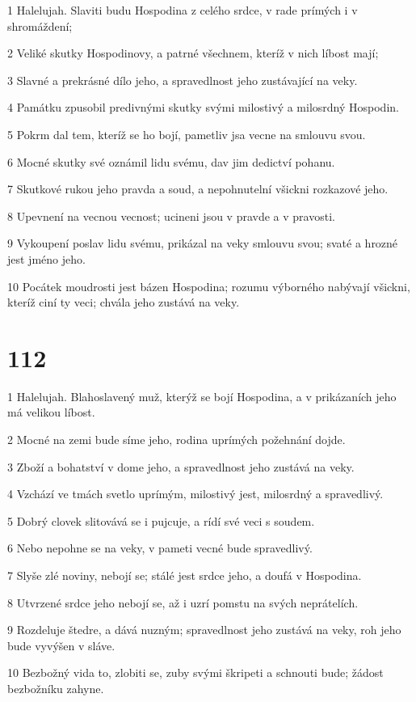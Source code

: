 \par 1 Halelujah. Slaviti budu Hospodina z celého srdce, v rade prímých i v shromáždení;
\par 2 Veliké skutky Hospodinovy, a patrné všechnem, kteríž v nich líbost mají;
\par 3 Slavné a prekrásné dílo jeho, a spravedlnost jeho zustávající na veky.
\par 4 Památku zpusobil predivnými skutky svými milostivý a milosrdný Hospodin.
\par 5 Pokrm dal tem, kteríž se ho bojí, pametliv jsa vecne na smlouvu svou.
\par 6 Mocné skutky své oznámil lidu svému, dav jim dedictví pohanu.
\par 7 Skutkové rukou jeho pravda a soud, a nepohnutelní všickni rozkazové jeho.
\par 8 Upevnení na vecnou vecnost; ucineni jsou v pravde a v pravosti.
\par 9 Vykoupení poslav lidu svému, prikázal na veky smlouvu svou; svaté a hrozné jest jméno jeho.
\par 10 Pocátek moudrosti jest bázen Hospodina; rozumu výborného nabývají všickni, kteríž ciní ty veci; chvála jeho zustává na veky.

\chapter{112}

\par 1 Halelujah. Blahoslavený muž, kterýž se bojí Hospodina, a v prikázaních jeho má velikou líbost.
\par 2 Mocné na zemi bude síme jeho, rodina uprímých požehnání dojde.
\par 3 Zboží a bohatství v dome jeho, a spravedlnost jeho zustává na veky.
\par 4 Vzchází ve tmách svetlo uprímým, milostivý jest, milosrdný a spravedlivý.
\par 5 Dobrý clovek slitovává se i pujcuje, a rídí své veci s soudem.
\par 6 Nebo nepohne se na veky, v pameti vecné bude spravedlivý.
\par 7 Slyše zlé noviny, nebojí se; stálé jest srdce jeho, a doufá v Hospodina.
\par 8 Utvrzené srdce jeho nebojí se, až i uzrí pomstu na svých neprátelích.
\par 9 Rozdeluje štedre, a dává nuzným; spravedlnost jeho zustává na veky, roh jeho bude vyvýšen v sláve.
\par 10 Bezbožný vida to, zlobiti se, zuby svými škripeti a schnouti bude; žádost bezbožníku zahyne.

